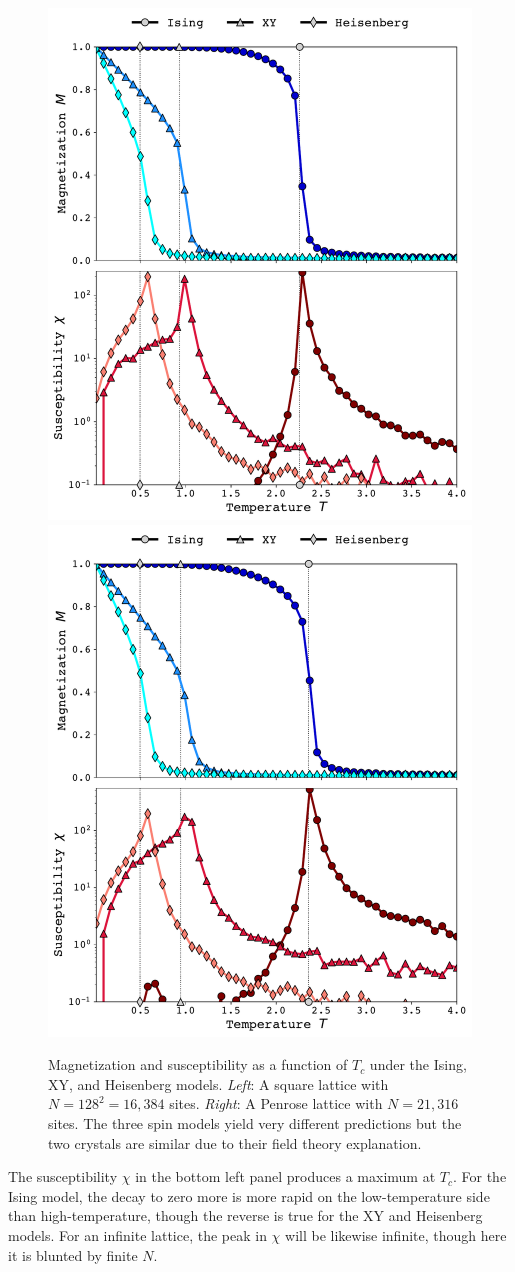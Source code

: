 \documentclass[
  amsmath,
  amssymb,
  aps,
  twocolumn,
  nofootinbib,
  nolongbibliography,
  floatfix,
]{revtex4-2}
\begin{document}
\begin{figure}
  \centering
  \includegraphics[width=0.49\linewidth]{../figs/square.pdf}\hfill
  \includegraphics[width=0.49\linewidth]{../figs/penrose.pdf}
  \caption{Magnetization and susceptibility as a function of $T_c$ under the Ising, XY, and Heisenberg models. \textit{Left}: A square lattice with $N=128^2=16,384$ sites. \textit{Right}: A Penrose lattice with $N=21,316$ sites. The three spin models yield very different predictions but the two crystals are similar due to their field theory explanation.}
  \label{fig:square}
\end{figure}

The susceptibility $\chi$ in the bottom left panel produces a maximum at $T_c$. For the Ising model, the decay to zero more is more rapid on the low-temperature side than high-temperature, though the reverse is true for the XY and Heisenberg models. For an infinite lattice, the peak in $\chi$ will be likewise infinite, though here it is blunted by finite $N$.
\end{document}
